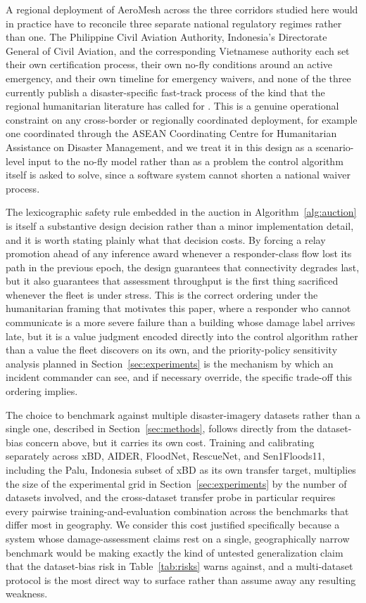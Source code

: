 \documentclass[drones,article,submit,moreauthors]{Definitions/mdpi}
\begin{document}
A regional deployment of AeroMesh across the three corridors studied here would in practice have to reconcile three separate national regulatory regimes rather than one. The Philippine Civil Aviation Authority, Indonesia's Directorate General of Civil Aviation, and the corresponding Vietnamese authority each set their own certification process, their own no-fly conditions around an active emergency, and their own timeline for emergency waivers, and none of the three currently publish a disaster-specific fast-track process of the kind that the regional humanitarian literature has called for \cite{icao_indonesia_uas,humanitarian2023drones}. This is a genuine operational constraint on any cross-border or regionally coordinated deployment, for example one coordinated through the ASEAN Coordinating Centre for Humanitarian Assistance on Disaster Management, and we treat it in this design as a scenario-level input to the no-fly model rather than as a problem the control algorithm itself is asked to solve, since a software system cannot shorten a national waiver process.

The lexicographic safety rule embedded in the auction in Algorithm~\ref{alg:auction} is itself a substantive design decision rather than a minor implementation detail, and it is worth stating plainly what that decision costs. By forcing a relay promotion ahead of any inference award whenever a responder-class flow lost its path in the previous epoch, the design guarantees that connectivity degrades last, but it also guarantees that assessment throughput is the first thing sacrificed whenever the fleet is under stress. This is the correct ordering under the humanitarian framing that motivates this paper, where a responder who cannot communicate is a more severe failure than a building whose damage label arrives late, but it is a value judgment encoded directly into the control algorithm rather than a value the fleet discovers on its own, and the priority-policy sensitivity analysis planned in Section~\ref{sec:experiments} is the mechanism by which an incident commander can see, and if necessary override, the specific trade-off this ordering implies.

The choice to benchmark against multiple disaster-imagery datasets rather than a single one, described in Section~\ref{sec:methods}, follows directly from the dataset-bias concern above, but it carries its own cost. Training and calibrating separately across xBD, AIDER, FloodNet, RescueNet, and Sen1Floods11, including the Palu, Indonesia subset of xBD as its own transfer target, multiplies the size of the experimental grid in Section~\ref{sec:experiments} by the number of datasets involved, and the cross-dataset transfer probe in particular requires every pairwise training-and-evaluation combination across the benchmarks that differ most in geography. We consider this cost justified specifically because a system whose damage-assessment claims rest on a single, geographically narrow benchmark would be making exactly the kind of untested generalization claim that the dataset-bias risk in Table~\ref{tab:risks} warns against, and a multi-dataset protocol is the most direct way to surface rather than assume away any resulting weakness.
\end{document}
